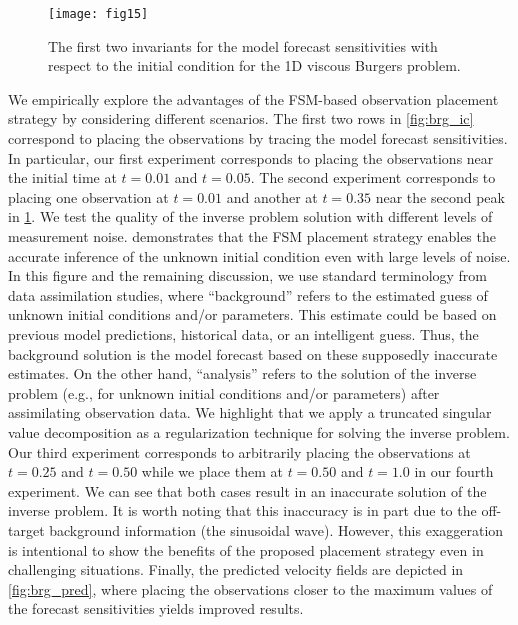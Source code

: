 \documentclass{article}
\begin{document}
\begin{figure}[ht!]
    \centering
    \texttt{[image: fig15]}
    \caption{\textcolor{rev}{The first two invariants for the model forecast sensitivities with respect to the initial condition for the 1D viscous Burgers problem.}}
    \label{fig:brg_sens}
\end{figure}

\textcolor{rev}{We empirically explore the advantages of the FSM-based observation placement strategy by considering different scenarios. The first two rows in \cref{fig:brg_ic} correspond to placing the observations by tracing the model forecast sensitivities. In particular, our first experiment corresponds to placing the observations near the initial time at $t=0.01$ and $t=0.05$. The second experiment corresponds to placing one observation at $t=0.01$ and another at $t=0.35$ near the second peak in \cref{fig:brg_sens}. We test the quality of the inverse problem solution with different levels of measurement noise.  demonstrates that the FSM placement strategy enables the accurate inference of the unknown initial condition even with large levels of noise. \textcolor{rev2}{In this figure and the remaining discussion, we use standard terminology from data assimilation studies, where ``background'' refers to the estimated guess of unknown initial conditions and/or parameters. This estimate could be based on previous model predictions, historical data, or an intelligent guess. Thus, the background solution is the model forecast based on these supposedly inaccurate estimates. On the other hand, ``analysis'' refers to the solution of the inverse problem (e.g., for unknown initial conditions and/or parameters) after assimilating observation data.} We highlight that we apply a truncated singular value decomposition as a regularization technique for solving the inverse problem. Our third experiment corresponds to arbitrarily placing the observations at $t=0.25$ and $t=0.50$ while we place them at $t=0.50$ and $t=1.0$ in our fourth experiment. We can see that both cases result in an inaccurate solution of the inverse problem. It is worth noting that this inaccuracy is in part due to the off-target background information (the sinusoidal wave). However, this exaggeration is intentional to show the benefits of the proposed placement strategy even in challenging situations. Finally, the predicted velocity fields are depicted in \cref{fig:brg_pred}, where placing the observations closer to the maximum values of the forecast sensitivities yields improved results.}
\end{document}
